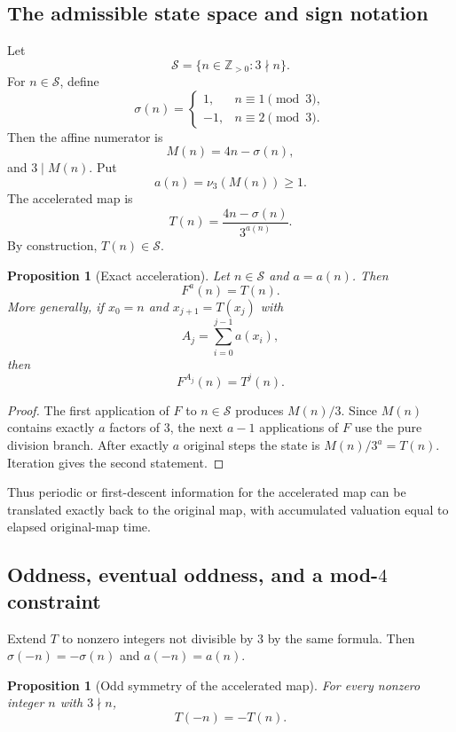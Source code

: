 \documentclass[11pt]{article}
\newtheorem{proposition}[theorem]{Proposition}
\theoremstyle{definition}
\theoremstyle{remark}
\newcommand{\vthree}{\nu_3}
\newcommand{\Sset}{\mathcal S}
\newcommand{\Z}{\mathbb Z}
\begin{document}
\subsection{The admissible state space and sign notation}

Let
\[
\Sset=\{n\in\Z_{>0}:3\nmid n\}.
\]
For $n\in\Sset$, define
\begin{equation}
\sigma(n)=
\begin{cases}
 1,&n\equiv1\pmod3,\\
 -1,&n\equiv2\pmod3.
\end{cases}
\label{eq:sigma}
\end{equation}
Then the affine numerator is
\[
M(n)=4n-\sigma(n),
\]
and $3\mid M(n)$.  Put
\[
a(n)=\vthree(M(n))\ge1.
\]
The accelerated map is
\begin{equation}
T(n)=\frac{4n-\sigma(n)}{3^{a(n)}}.
\label{eq:accelerated}
\end{equation}
By construction, $T(n)\in\Sset$.

\begin{proposition}[Exact acceleration]
Let $n\in\Sset$ and $a=a(n)$.  Then
\[
F^a(n)=T(n).
\]
More generally, if $x_0=n$ and $x_{j+1}=T(x_j)$ with
\[
A_j=\sum_{i=0}^{j-1}a(x_i),
\]
then
\[
F^{A_j}(n)=T^j(n).
\]
\end{proposition}

\begin{proof}
The first application of $F$ to $n\in\Sset$ produces $M(n)/3$.  Since $M(n)$ contains exactly $a$ factors of $3$, the next $a-1$ applications of $F$ use the pure division branch.  After exactly $a$ original steps the state is $M(n)/3^a=T(n)$.  Iteration gives the second statement.
\end{proof}

Thus periodic or first-descent information for the accelerated map can be translated exactly back to the original map, with accumulated valuation equal to elapsed original-map time.

\subsection{Oddness, eventual oddness, and a mod-$4$ constraint}

Extend $T$ to nonzero integers not divisible by $3$ by the same formula.  Then $\sigma(-n)=-\sigma(n)$ and $a(-n)=a(n)$.

\begin{proposition}[Odd symmetry of the accelerated map]
For every nonzero integer $n$ with $3\nmid n$,
\[
T(-n)=-T(n).
\]
\end{proposition}
\end{document}

